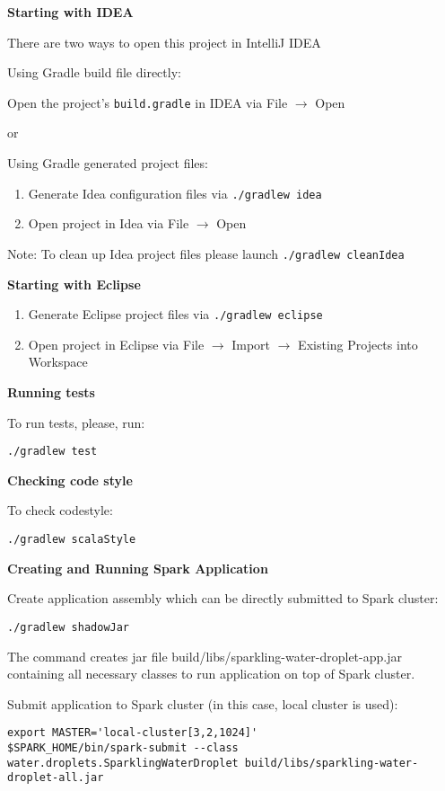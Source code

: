 \textbf{Starting with IDEA}

There are two ways to open this project in IntelliJ IDEA

Using Gradle build file directly:

Open the project's \texttt{build.gradle} in IDEA via File $\rightarrow$ Open

or

Using Gradle generated project files:

\begin{enumerate}
\item Generate Idea configuration files via  {\lstinline[style=Bash]|./gradlew idea|} 
\item Open project in Idea via File $\rightarrow$ Open
\end{enumerate}

Note: To clean up Idea project files please launch {\lstinline[style=Bash]|./gradlew cleanIdea|} 

\textbf{Starting with Eclipse}

\begin{enumerate}
\item Generate Eclipse project files via {\lstinline[style=Bash]|./gradlew eclipse|} 
\item Open project in Eclipse via File $\rightarrow$ Import $\rightarrow$ Existing Projects into Workspace
\end{enumerate}

\textbf{Running tests}

To run tests, please, run:

\begin{lstlisting}[style=Bash]
./gradlew test
\end{lstlisting}

\textbf{Checking code style}

To check codestyle:

\begin{lstlisting}[style=Bash]
./gradlew scalaStyle
\end{lstlisting}

\textbf{Creating and Running Spark Application}

Create application assembly which can be directly submitted to Spark cluster:

\begin{lstlisting}[style=Bash]
./gradlew shadowJar
\end{lstlisting}

The command creates jar file build/libs/sparkling-water-droplet-app.jar containing all necessary classes to run application on top of Spark cluster.

Submit application to Spark cluster (in this case, local cluster is used):

\begin{lstlisting}[style=Bash]
export MASTER='local-cluster[3,2,1024]'
$SPARK_HOME/bin/spark-submit --class water.droplets.SparklingWaterDroplet build/libs/sparkling-water-droplet-all.jar
\end{lstlisting}


